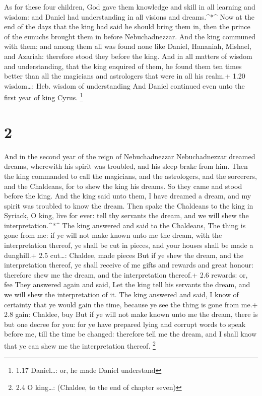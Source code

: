  As for these four children, God gave them knowledge and
skill in all learning and wisdom: and Daniel had understanding in all
visions and dreams.\^{}*\^{}  Now at the end of the days
that the king had said he should bring them in, then the prince of the
eunuchs brought them in before Nebuchadnezzar.  And the
king communed with them; and among them all was found none like Daniel,
Hananiah, Mishael, and Azariah: therefore stood they before the king.
 And in all matters of wisdom and understanding, that the
king enquired of them, he found them ten times better than all the
magicians and astrologers that were in all his realm.+ 1.20
wisdom\ldots: Heb. wisdom of understanding  And Daniel
continued even unto the first year of king Cyrus. \footnote{1.17
  Daniel\ldots: or, he made Daniel understand}

\hypertarget{section-1}{%
\section{2}\label{section-1}}

 And in the second year of the reign of Nebuchadnezzar
Nebuchadnezzar dreamed dreams, wherewith his spirit was troubled, and
his sleep brake from him.  Then the king commanded to call
the magicians, and the astrologers, and the sorcerers, and the
Chaldeans, for to shew the king his dreams. So they came and stood
before the king.  And the king said unto them, I have
dreamed a dream, and my spirit was troubled to know the dream.
 Then spake the Chaldeans to the king in Syriack, O king,
live for ever: tell thy servants the dream, and we will shew the
interpretation.\^{}*\^{}  The king answered and said to the
Chaldeans, The thing is gone from me: if ye will not make known unto me
the dream, with the interpretation thereof, ye shall be cut in pieces,
and your houses shall be made a dunghill.+ 2.5 cut\ldots: Chaldee, made
pieces  But if ye shew the dream, and the interpretation
thereof, ye shall receive of me gifts and rewards and great honour:
therefore shew me the dream, and the interpretation thereof.+ 2.6
rewards: or, fee  They answered again and said, Let the king
tell his servants the dream, and we will shew the interpretation of it.
 The king answered and said, I know of certainty that ye
would gain the time, because ye see the thing is gone from me.+ 2.8
gain: Chaldee, buy  But if ye will not make known unto me
the dream, there is but one decree for you: for ye have prepared lying
and corrupt words to speak before me, till the time be changed:
therefore tell me the dream, and I shall know that ye can shew me the
interpretation thereof. \footnote{2.4 O king\ldots: (Chaldee, to the end
  of chapter seven)}

